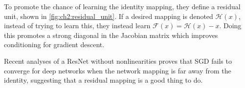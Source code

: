   To promote the chance of learning the identity mapping, they define a residual
  unit, shown in \autoref{fig:ch2:residual_unit}. If a desired mapping is
  denoted $\mathcal{H}(x)$, instead of trying to learn this, they instead learn
  $\mathcal{F}(x) = \mathcal{H}(x) - x$. Doing this promotes a strong diagonal
  in the Jacobian matrix which improves conditioning for gradient descent.

  Recent analyses of a ResNet without nonlinearities
  \cite{bartlett_representing_2018, bartlett_gradient_2018} proves that SGD
  fails to converge for deep networks when the network mapping is far away from
  the identity, suggesting that a residual mapping is a good thing to do.
